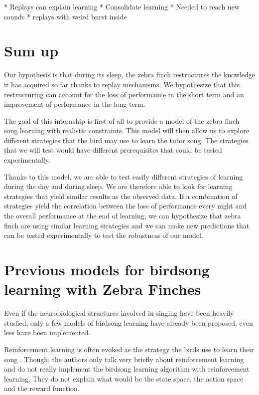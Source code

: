 {* Replays can explain learning \cite{margoliash_offline_2003}
* Consolidate learning
* Needed to reach new sounds \cite{margoliash_offline_2003}
* replays with weird burst inside \cite{margoliash_evaluating_2002}

\section{Sum up}
Our hypothesis is that during its sleep, the zebra finch restructures the
knowledge it has acquired so far thanks to replay mechanisms. We hypothesize
that this restructuring can account for the loss of performance in the short
term and an improvement of performance in the long term.

The goal of this internship is first of all to provide a model of the zebra
finch song learning with realistic constraints. This model will then allow us to
explore different strategies that the bird may use to learn the tutor song. The
strategies that we will test would have different prerequisites that could be
tested experimentally.

Thanks to this model, we are able to test easily different strategies of
learning during the day and during sleep. We are therefore able to look for
learning strategies that yield similar results as the observed data. If a
combination of strategies yield the correlation between the loss of performance
every night and the overall performance at the end of learning, we can
hypothesize that zebra finch are using similar learning strategies and we can
make new predictions that can be tested experimentally to test the robustness
of our model.

\section{Previous models for birdsong learning with Zebra Finches}

Even if the neurobiological structures involved in singing have been heavily
studied, only a few models of birdsong learning have already been proposed, even
less have been implemented.

Reinforcement learning is often evoked as the strategy the birds use to learn
their song \parencite{dave_song_2000,marler_three_1997}. Though,
the authors only talk very briefly about reinforcement learning and do not
really implement the birdsong learning algorithm with reinforcement learning.
They do not explain what would be the state space, the action space and the
reward function.

}
